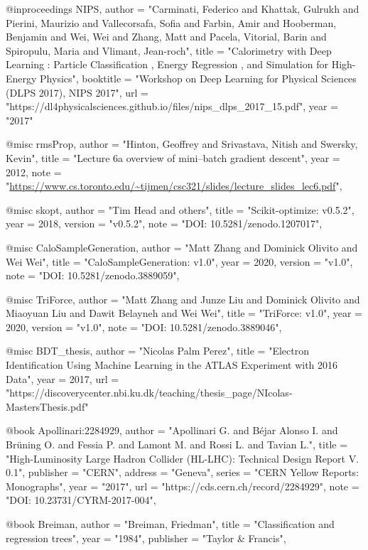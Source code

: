 @inproceedings{
	NIPS,
    author  = "Carminati, Federico and Khattak, Gulrukh and Pierini, Maurizio and Vallecorsafa, Sofia and Farbin, Amir and Hooberman, Benjamin and Wei, Wei and Zhang, Matt and Pacela, Vitorial, Barin and Spiropulu, Maria and Vlimant, Jean-roch",
    title   = "Calorimetry with Deep Learning : Particle Classification , Energy Regression , and Simulation for High-Energy Physics",
    booktitle   = "Workshop on Deep Learning for Physical Sciences (DLPS 2017), NIPS 2017",
    url     = "https://dl4physicalsciences.github.io/files/nips\_dlps\_2017\_15.pdf",
    year    = "2017"
}

@misc{
	rmsProp,
    author  = "Hinton, Geoffrey and Srivastava, Nitish and Swersky, Kevin",
    title   = "Lecture  6a  overview  of  mini–batch  gradient descent",
    year    = 2012,
    note    = "\url{https://www.cs.toronto.edu/~tijmen/csc321/slides/lecture\_slides\_lec6.pdf}",
}

@misc{
	skopt,
    author  = "Tim Head and others",
    title   = "Scikit-optimize: v0.5.2",
    year    = 2018,
    version = "v0.5.2",
    note    = "DOI: 10.5281/zenodo.1207017",
}

@misc{
	CaloSampleGeneration,
    author  = "Matt Zhang and Dominick Olivito and Wei Wei",
    title   = "CaloSampleGeneration: v1.0",
    year    = 2020,
    version = "v1.0",
    note    = "DOI: 10.5281/zenodo.3889059",
}

@misc{
	TriForce,
    author  = "Matt Zhang and Junze Liu and Dominick Olivito and Miaoyuan Liu and Dawit Belayneh and Wei Wei",
    title   = "TriForce: v1.0",
    year    = 2020,
    version = "v1.0",
    note    = "DOI: 10.5281/zenodo.3889046",
}

@misc{
	BDT_thesis,
    author  = "Nicolas Palm Perez",
    title   = "Electron Identification Using Machine Learning in the ATLAS Experiment with 2016 Data",
    year    = 2017,
    url     = "https://discoverycenter.nbi.ku.dk/teaching/thesis\_page/NIcolas-MastersThesis.pdf"
}

@book{
	Apollinari:2284929,
    author  = "Apollinari G. and Béjar Alonso I. and Brüning O. and Fessia P. and Lamont M. and Rossi L. and Tavian L.",
    title   = "High-Luminosity Large Hadron Collider (HL-LHC): Technical Design Report V. 0.1",
    publisher   = "CERN",
    address = "Geneva",
    series  = "CERN Yellow Reports: Monographs",
    year    = "2017",
    url     = "https://cds.cern.ch/record/2284929",
    note    = "DOI: 10.23731/CYRM-2017-004",
}

@book{
	Breiman,
    author  = "Breiman, Friedman",
    title   = "Classification and regression trees",
    year    = "1984",
    publisher   = "Taylor \& Francis",
}

